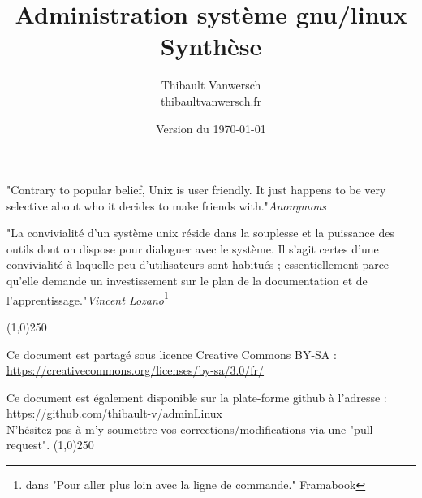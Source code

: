 \documentclass[a4paper]{article}
\title{Administration système gnu/linux\\Synthèse}
\author{
    Thibault Vanwersch \\
    thibault\at vanwersch.fr
}
\date{Version du \today}
\begin{document}
\maketitle
\par{"Contrary to popular belief, Unix is user friendly. It just happens to be very selective about who it decides to make friends with."\hfill\emph{Anonymous}}

\par{"La convivialité d’un système unix réside dans la souplesse et la puissance des outils dont on dispose pour dialoguer avec le système. Il s’agit certes d’une convivialité à laquelle peu d’utilisateurs sont habitués ; essentiellement parce qu’elle demande un investissement sur le plan de la documentation et de l’apprentissage."\hfill\emph{Vincent Lozano}\footnote{dans "Pour aller plus loin avec la ligne de commande." Framabook}}

\begin{center}
\line(1,0){250}
\par Ce document est partagé sous licence Creative Commons BY-SA :\\
\url{https://creativecommons.org/licenses/by-sa/3.0/fr/}
\par Ce document est également disponible sur la plate-forme github à l'adresse :\\
https://github.com/thibault-v/adminLinux \\
N'hésitez pas à m'y soumettre vos corrections/modifications via une "pull request".
\line(1,0){250}
\end{center}

\tableofcontents 
\end{document}
